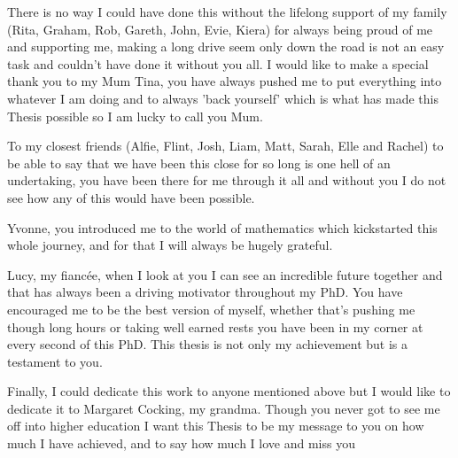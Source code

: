 \documentclass[12pt,english]{report}
\begin{document}
There is no way I could have done this without the lifelong support of my family (Rita, Graham, Rob, Gareth, John, Evie, Kiera) for always being proud of me and supporting me, making a long drive seem only down the road is not an easy task and couldn't have done it without you all. I would like to make a special thank you to my Mum Tina, you have always pushed me to put everything into whatever I am doing and to always 'back yourself' which is what has made this Thesis possible so I am lucky to call you Mum.

To my closest friends (Alfie, Flint, Josh, Liam, Matt, Sarah, Elle and Rachel) to be able to say that we have been this close for so long is one hell of an undertaking, you have been there for me through it all and without you I do not see how any of this would have been possible. 

Yvonne, you introduced me to the world of mathematics which kickstarted this whole journey, and for that I will always be hugely grateful.

Lucy, my fianc\'ee, when I look at you I can see an incredible future together and that has always been a driving motivator throughout my PhD. You have encouraged me to be the best version of myself, whether that's pushing me though long hours or taking well earned rests you have been in my corner at every second of this PhD. This thesis is not only my achievement but is a testament to you.

Finally, I could dedicate this work to anyone mentioned above but I would like to dedicate it to Margaret Cocking, my grandma. Though you never got to see me off into higher education I want this Thesis to be my message to you on how much I have achieved, and to say how much I love and miss you
\vspace*{\fill}

\newpage
\pagestyle{fancy}
\fancyhf{}
\renewcommand{\headrulewidth}{1 pt}
\renewcommand{\headrule}{\hbox to\headwidth{\color{gray}\leaders\hrule height \headrulewidth\hfill}}
\tableofcontents

\newpage
{}


\fancyhead[LO]{\color{gray} \nouppercase{\rightmark}}
\fancyhead[RE]{\color{gray} \nouppercase{\leftmark}}

\setcounter{page}{1}


\newpage


\newpage


\newpage


\newpage


\newpage


\newpage


\newpage
{}
\printbibliography
\end{document}
